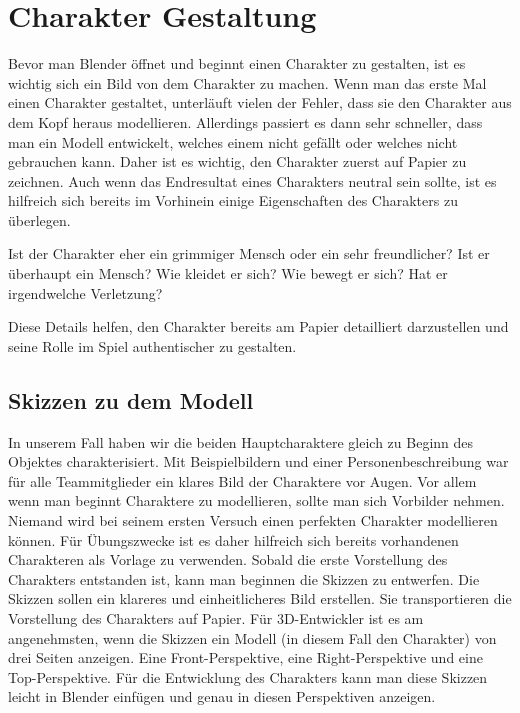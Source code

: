 \section{Charakter Gestaltung}
Bevor man Blender öffnet und beginnt einen Charakter zu gestalten, ist es wichtig sich ein Bild von
dem Charakter zu machen. Wenn man das erste Mal einen Charakter gestaltet, unterläuft vielen der
Fehler, dass sie den Charakter aus dem Kopf heraus modellieren. Allerdings passiert es dann sehr
schneller, dass man ein Modell entwickelt, welches einem nicht gefällt oder welches nicht
gebrauchen kann. Daher ist es wichtig, den Charakter zuerst auf Papier zu zeichnen. Auch wenn das
Endresultat eines Charakters neutral sein sollte, ist es hilfreich sich bereits im Vorhinein einige
Eigenschaften des Charakters zu überlegen.

Ist der Charakter eher ein grimmiger Mensch oder ein sehr freundlicher? Ist er überhaupt ein
Mensch? Wie kleidet er sich? Wie bewegt er sich? Hat er irgendwelche Verletzung?

Diese Details helfen, den Charakter bereits am Papier detailliert darzustellen und seine Rolle im Spiel
authentischer zu gestalten.

\subsection{Skizzen zu dem Modell}

In unserem Fall haben wir die beiden Hauptcharaktere gleich zu Beginn des Objektes charakterisiert.
Mit Beispielbildern und einer Personenbeschreibung war für alle Teammitglieder ein klares Bild der
Charaktere vor Augen. Vor allem wenn man beginnt Charaktere zu modellieren, sollte man sich
Vorbilder nehmen. Niemand wird bei seinem ersten Versuch einen perfekten Charakter modellieren
können. Für Übungszwecke ist es daher hilfreich sich bereits vorhandenen Charakteren als Vorlage
zu verwenden.
Sobald die erste Vorstellung des Charakters entstanden ist, kann man beginnen die Skizzen zu
entwerfen. Die Skizzen sollen ein klareres und einheitlicheres Bild erstellen. Sie transportieren die
Vorstellung des Charakters auf Papier. Für 3D-Entwickler ist es am angenehmsten, wenn die Skizzen ein Modell
(in diesem Fall den Charakter) von drei Seiten anzeigen. Eine Front-Perspektive, eine Right-Perspektive und eine
Top-Perspektive. Für die Entwicklung des Charakters kann man diese Skizzen leicht in Blender einfügen und genau
in diesen Perspektiven anzeigen.



